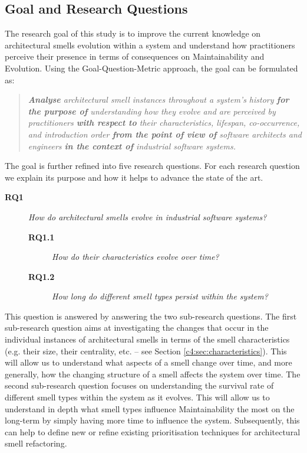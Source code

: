 \subsection{Goal and Research Questions}
The research goal of this study is to improve the current knowledge on architectural smells evolution within a system and understand how practitioners perceive their presence in terms of consequences on Maintainability and Evolution.
Using the Goal-Question-Metric \cite{VanSolingen2002} approach, the goal can be formulated as: 
\begin{quote}
    \itshape
    \textbf{Analyse} architectural smell instances throughout a system's history \textbf{for the purpose of} understanding how they evolve and are perceived by practitioners \textbf{with respect to} their characteristics, lifespan, co-occurrence, and introduction order \textbf{from the point of view of} software architects and engineers \textbf{in the context of} industrial software systems.
\end{quote}

The goal is further refined into five research questions. For each research question we explain its purpose and how it helps to advance the state of the art.

\begin{description}
    \item[\textbf{RQ1}] \textit{How do architectural smells evolve in industrial software systems?}
     \begin{description}
         \item[\textbf{RQ1.1}] \textit{How do their characteristics evolve over time?}
         \item[\textbf{RQ1.2}] \textit{How long do different smell types persist within the system?}
     \end{description} 
\end{description}

This question is answered by answering the two sub-research questions.
The first sub-research question aims at investigating the changes that occur in the individual instances of architectural smells in terms of the smell characteristics (e.g. their size, their centrality, etc. -- see Section \ref{c4:sec:characteristics}). This will allow us to understand what aspects of a smell change over time, and more generally, how the changing structure of a smell affects the system over time.
The second sub-research question focuses on understanding the survival rate of different smell types within the system as it evolves. This will allow us to understand in depth what smell types influence Maintainability the most on the long-term by simply having more time to influence the system. Subsequently, this can help to define new or refine existing prioritisation techniques for architectural smell refactoring.

